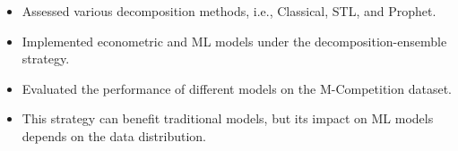\documentclass{mycv}
\begin{document}
\vspace{-\parskip}

\begin{itemize}
  \item Assessed various decomposition methods, i.e., Classical, STL, and Prophet.
  \item Implemented econometric and ML models under the decomposition-ensemble strategy.
  \item Evaluated the performance of different models on the M-Competition dataset.
  \item This strategy can benefit traditional models, but its impact on ML models depends on the data distribution.
\end{itemize}








\end{document}
